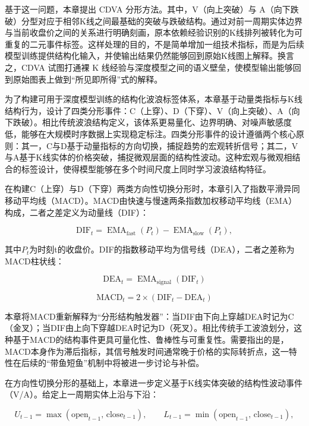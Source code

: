 基于这一问题，本章提出 CDVA 分形方法。其中，V（向上突破）与 A（向下跌破）分型对应于相邻K线之间最基础的突破与跌破结构。通过对前一周期实体边界与当前收盘价之间的关系进行明确刻画，原本依赖经验识别的K线排列被转化为可重复的二元事件标签。这样处理的目的，不是简单增加一组技术指标，而是为后续模型训练提供结构化输入，并使输出结果仍然能够回到原始K线图上解释。换言之，CDVA 试图打通裸 K 线经验与深度模型之间的语义壁垒，使模型输出能够回到原始图表上做到“所见即所得”式的解释。

为了构建可用于深度模型训练的结构化波浪标签体系，本章基于动量类指标与K线结构行为，设计了四类分形事件：C（上穿）、D（下穿）、V（向上突破）、A（向下跌破）。相比传统波浪结构定义，该体系更易量化、边界明确、对噪声敏感度低，能够在大规模时序数据上实现稳定标注。四类分形事件的设计遵循两个核心原则：其一，C与D基于动量指标的方向切换，捕捉趋势的宏观转折信号；其二，V与A基于K线实体的价格突破，捕捉微观层面的结构性波动。这种宏观与微观相结合的标签设计，使得模型能够在多个时间尺度上同时学习波浪结构特征。

在构建C（上穿）与D（下穿）两类方向性切换分形时，本章引入了指数平滑异同移动平均线（MACD）。MACD由快速与慢速两条指数加权移动平均线（EMA）构成，二者之差定义为动量线（DIF）：

\begin{equation}
\mathrm{DIF}_t = \operatorname{EMA}_{\text{fast}}(P_t) - \operatorname{EMA}_{\text{slow}}(P_t),
\end{equation}

其中$P_t$为时刻t的收盘价。DIF的指数移动平均为信号线（DEA），二者之差称为MACD柱状线：

\begin{equation} \mathrm{DEA}_t = \operatorname{EMA}_{\text{signal}}(\mathrm{DIF}_t) \label{eq:dea} \end{equation}

\begin{equation} \mathrm{MACD}_t = 2 \times (\mathrm{DIF}_t - \mathrm{DEA}_t) \label{eq:macd} \end{equation}

本章将MACD重新解释为``分形结构触发器''：当DIF由下向上穿越DEA时记为C（金叉）；当DIF由上向下穿越DEA时记为D（死叉）。相比传统手工波浪划分，这种基于MACD的结构事件更具可量化性、鲁棒性与可重复性。需要指出的是，MACD本身作为滞后指标，其信号触发时间通常晚于价格的实际转折点，这一特性在后续的``带鱼短鱼''机制中将被进一步讨论与补偿。

在方向性切换分形的基础上，本章进一步定义基于K线实体突破的结构性波动事件（V/A）。给定上一周期实体上沿与下沿：

\begin{equation}
U_{t-1} = \max(\mathrm{open}_{t-1},\, \mathrm{close}_{t-1}),
\qquad
L_{t-1} = \min(\mathrm{open}_{t-1},\, \mathrm{close}_{t-1}),
\end{equation}

